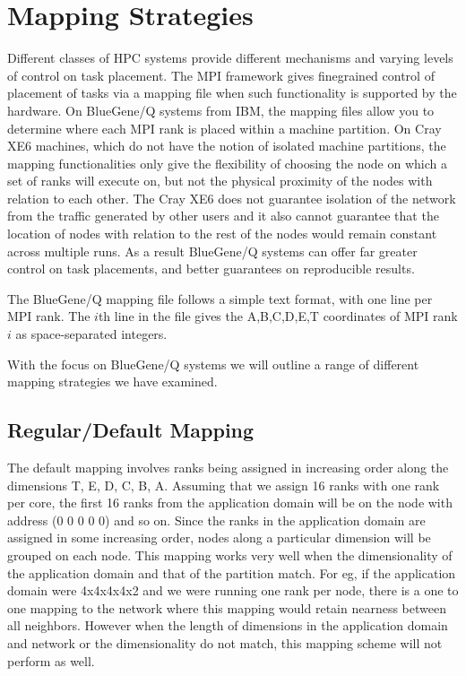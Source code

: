 \documentclass{acm_proc_article-sp}
\begin{document}
\section{Mapping Strategies}
Different classes of HPC systems provide different mechanisms and varying levels of control on task placement.
The MPI framework gives finegrained control of placement of tasks via a mapping file when such functionality
is supported by the hardware. On BlueGene/Q systems from IBM, the mapping files allow you to determine where
each MPI rank is placed within a machine partition. On Cray XE6 machines, which do not have the notion of
isolated machine partitions, the mapping functionalities only give the flexibility of choosing the node on
which a set of ranks will execute on, but not the physical proximity of the nodes with relation to each other.
The Cray XE6 does not guarantee isolation of the network from the traffic generated by other users and it
also cannot guarantee that the location of nodes with relation to the rest of the nodes would remain constant
across multiple runs. As a result BlueGene/Q systems can offer far greater control on task placements, and
better guarantees on reproducible results.

The BlueGene/Q mapping file follows a simple text format, with one
line per MPI rank.  The $i$th line in the file gives the A,B,C,D,E,T
coordinates of MPI rank $i$ as space-separated integers.

With the focus on BlueGene/Q systems we will outline a range of different mapping strategies we have examined.

\subsection{Regular/Default Mapping}
The default mapping involves ranks being assigned in increasing order along the dimensions T, E, D, C, B, A.
Assuming that we assign 16 ranks with one rank per core, the first 16 ranks from the application domain will
be on the node with address (0 0 0 0 0) and so on. Since the ranks in the application domain are assigned in
some increasing order, nodes along a particular dimension will be grouped on each node. This mapping works
very well when the dimensionality of the application domain and that of the partition match. For eg, if the
application domain were 4x4x4x4x2 and we were running one rank per node, there is a one to one mapping to the
network where this mapping would retain nearness between all neighbors. However when the length of dimensions
in the application domain and network or the dimensionality do not match, this mapping scheme will not perform as well.
\end{document}
